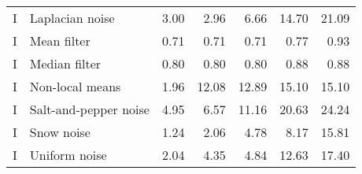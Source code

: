 \begin{tabular}{llrrrrr}
I    &        Laplacian noise &  3.00 &  2.96 &  6.66 & 14.70 & 21.09 \\
I    &            Mean filter &  0.71 &  0.71 &  0.71 &  0.77 &  0.93 \\
I    &          Median filter &  0.80 &  0.80 &  0.80 &  0.88 &  0.88 \\
I    &        Non-local means &  1.96 & 12.08 & 12.89 & 15.10 & 15.10 \\
I    &  Salt-and-pepper noise &  4.95 &  6.57 & 11.16 & 20.63 & 24.24 \\
I    &             Snow noise &  1.24 &  2.06 &  4.78 &  8.17 & 15.81 \\
I    &          Uniform noise &  2.04 &  4.35 &  4.84 & 12.63 & 17.40 \\
\bottomrule
\end{tabular}
